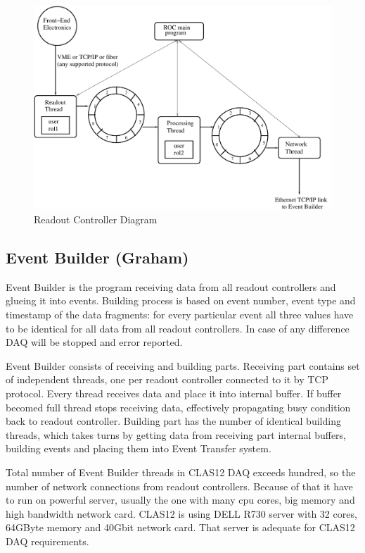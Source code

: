 \begin{figure}[hbt]
	\centering
	\includegraphics[width=1.0\columnwidth,keepaspectratio]{img/roc_diagram.pdf}
	\caption{Readout Controller Diagram}
	\label{fig:roc_diagram}
\end{figure}


\subsection{Event Builder (Graham)}

Event Builder is the program receiving data from all readout controllers and glueing it into events. Building process is based on event number, event type and timestamp of the data fragments: for every particular event all three values have to be identical for all data from all readout controllers. In case of any difference DAQ will be stopped and error reported.

Event Builder consists of receiving and building parts. Receiving part contains set of independent threads, one per readout controller connected to it by TCP protocol. Every thread receives data and place it into internal buffer. If buffer becomed full thread stops receiving data, effectively propagating busy condition back to readout controller.
Building part has the number of identical building threads, which takes turns by getting data from receiving part internal buffers, building events and placing them into Event Transfer system.

Total number of Event Builder threads in CLAS12 DAQ exceeds hundred, so the number of network connections from readout controllers. Because of that it have to run on powerful server, usually the one with many cpu cores, big memory and high bandwidth network card. CLAS12 is using DELL R730 server with 32 cores, 64GByte memory and 40Gbit network card. That server is adequate for CLAS12 DAQ requirements.


